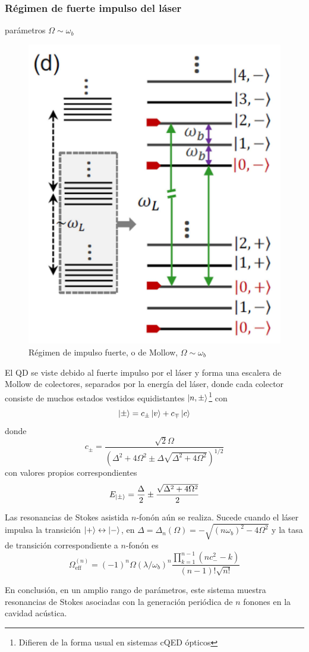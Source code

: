 \documentclass[main.tex]{subfiles}
\begin{document}
\subsubsection{Régimen de fuerte impulso del láser}
parámetros $\Omega \sim \omega_b$
\begin{figure}[th]
	\centering
	\includegraphics[width=0.3\linewidth]{img/resonancesStokes3}
	\caption{Régimen de impulso fuerte, o de Mollow, $\Omega \sim \omega_b$ \parencite{Bin2020}}
	\label{fig:resonancesstokes3}
\end{figure}
El QD se viste debido al fuerte impulso por el láser y forma una escalera de Mollow de colectores, separados por la energía del láser, donde cada colector consiste de muchos estados vestidos equidistantes $\ket{n,\pm}$\footnote{Difieren de la forma usual en sistemas cQED ópticos} con
\begin{equation}
	\ket{\pm} = c_\pm \ket{v} + c_\mp \ket{c}
\end{equation}
donde 
\begin{equation}
	c_\pm = \frac{\sqrt{2} \Omega}{(\Delta^2+4\Omega^2 \pm \Delta\sqrt{\Delta^2+4\Omega^2})^{1/2}}
\end{equation}
con valores propios correspondientes
\begin{equation}
	E_{\ket{\pm}} = \frac{\Delta}{2} \pm \frac{\sqrt{\Delta^2+4\Omega^2}}{2}
\end{equation}

Las resonancias de Stokes asistida $n$-fonón aún se realiza. Sucede cuando el láser impulsa la transición $\ket{+} \leftrightarrow \ket{-}$, en $\Delta = \Delta_n(\Omega) = -\sqrt{(n\omega_b)^2-4\Omega^2}$ y la tasa de transición correspondiente a $n$-fonón es \parencite{Bin2020}
\begin{equation}\label{eq:effRabi3}
	\Omega_\text{eff}^{(n)} = (-1)^n \Omega (\lambda/\omega_b)^n \frac{\prod_{k=1}^{n-1}(nc_-^2-k)}{(n-1)!\sqrt{n!}}
\end{equation}

En conclusión, en un amplio rango de parámetros, este sistema muestra resonancias de Stokes asociadas con la generación periódica de $n$ fonones en la cavidad acústica.
\end{document}
